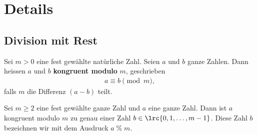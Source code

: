 \chapter{Details}\label{ch:Details}

\section{Division mit Rest}\label{sec:DivisionMitRest}
\begin{mydefinition}
Sei $m > 0$ eine fest gewählte natürliche Zahl. Seien $a$ und $b$ ganze Zahlen. Dann heissen $a$ und $b$ \textbf{kongruent modulo} $m$, geschrieben
\begin{align*}
	a \equiv b \pmod{m},
\end{align*}
falls $m$ die Differenz $(a - b)$ teilt.
\end{mydefinition}


\begin{mydefinition}
Sei $m \geq 2$ eine fest gewählte ganze Zahl und $a$ eine ganze Zahl. Dann ist $a$ kongruent modulo $m$ zu genau einer Zahl $b\in\lrc{0, 1, \ldots, m-1}$. Diese Zahl $b$ bezeichnen wir mit dem Ausdruck $a\; \% \; m$.
\end{mydefinition}

